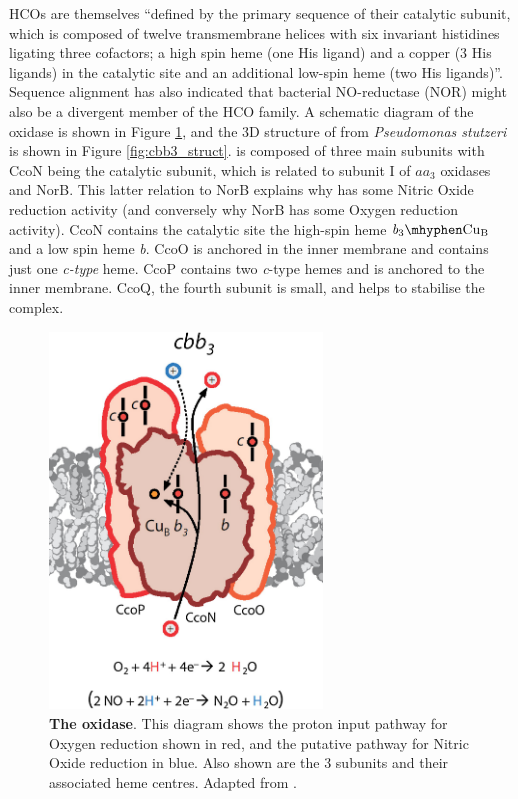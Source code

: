 HCOs are themselves ``defined by the primary sequence of their catalytic subunit, which is composed of twelve transmembrane helices with six invariant histidines ligating three cofactors; a high spin heme (one His ligand) and a copper (3 His ligands) in the catalytic site and an additional low-spin heme (two His ligands)''\cite{Huang2010}. Sequence alignment has also indicated that bacterial NO-reductase (NOR) might also be a divergent member of the HCO family. A schematic diagram of the \cbbthree{} oxidase is shown in Figure \ref{fig:cbb3}, and the 3D structure of \cbbthree{} from \textit{Pseudomonas stutzeri} is shown in Figure \ref{fig:cbb3_struct}. \cbbthree{} is composed of three main subunits with CcoN being the catalytic subunit, which is related to subunit I of $\mathit{aa}_3$ oxidases and NorB. This latter relation to NorB explains why \cbbthree{} has some Nitric Oxide reduction activity (and conversely why NorB has some Oxygen reduction activity)\cite{Huang2010}. CcoN contains the catalytic site \textendash{} the high-spin heme $\mathit{b}_3\mhyphen\mathrm{Cu}_{\mathrm{B}}$ \textendash{} and a low spin heme \textit{b}. CcoO is anchored in the inner membrane and contains just one \textit{c-type} heme. CcoP contains two \textit{c}-type hemes and is anchored to the inner membrane. CcoQ, the fourth subunit is small, and helps to stabilise the complex\cite{Huang2010}.

\begin{figure}[tbp]
  \begin{center}
    \includegraphics[height=10cm]{01-introduction/data/cbb3_only.png}
  \end{center}
  \caption[{The \cbbthree{} oxidase}.]{{\bf The \cbbthree{} oxidase}. This diagram shows the proton input pathway for Oxygen reduction shown in red, and the putative pathway for Nitric Oxide reduction in blue. Also shown are the 3 subunits and their associated heme centres. Adapted from \citet{Huang2010}.
  \label{fig:cbb3}}
\end{figure}

